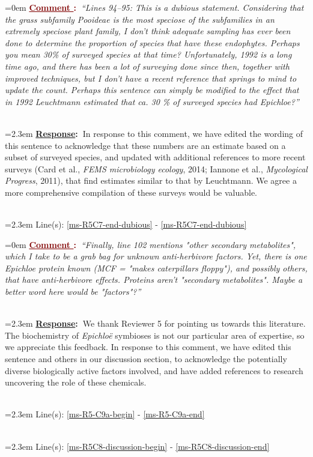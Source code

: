 \documentclass[12pt]{article}
\newcounter{cN}
\newcommand{\comment}[1]{
	\vspace{2em}
	\refstepcounter{cN} %
	\noindent \hangindent=0em \textbf{\textcolor{Maroon}{\uline{Comment \thecN}:~}}\emph{``#1''}
	}
\newcommand{\response}[1]{
	\\[0.25em]
	\hangindent=2.3em \textbf{\textcolor{NavyBlue}{\uline{Response}:~}}#1
	}
\newcommand{\linesref}[2]{
		\\[0.25em]
	\hangindent=2.3em {\color{Mahogany} Line(s): \ref{#1} - \ref{#2}}
}
\begin{document}
\comment{Lines 94–95: This is a dubious statement. Considering that the grass subfamily Pooideae is the most speciose of the subfamilies in an extremely speciose plant family, I don't think adequate sampling has ever been done to determine the proportion of species that have these endophytes. Perhaps you mean 30\% of surveyed species at that time? Unfortunately, 1992 is a long time ago, and there has been a lot of surveying done since then, together with improved techniques, but I don't have a recent reference that springs to mind to update the count. Perhaps this sentence can simply be modified to the effect that in 1992 Leuchtmann estimated that ca. 30 \% of surveyed species had Epichloe?}
\response{In response to this comment, we have edited the wording of this sentence to acknowledge that these numbers are an estimate based on a subset of surveyed species, and updated with additional references to more recent surveys (Card et al., \emph{FEMS microbiology ecology}, 2014; Iannone et al., \emph{Mycological Progress}, 2011), that find estimates similar to that by Leuchtmann. We agree a more comprehensive compilation of these surveys would be valuable.}
\linesref{ms-R5C7-end-dubious}{ms-R5C7-end-dubious}

\comment{Finally, line 102 mentions "other secondary metabolites", which I take to be a grab bag for unknown anti-herbivore factors. Yet, there is one Epichloe protein known (MCF = "makes caterpillars floppy"), and possibly others, that have anti-herbivore effects. Proteins aren't "secondary metabolites". Maybe a better word here would be "factors"?}
\response{We thank Reviewer 5 for pointing us towards this literature. The biochemistry of \emph{Epichloë} symbioses is not our particular area of expertise, so we appreciate this feedback. In response to this comment, we have edited this sentence and others in our discussion section, to acknowledge the potentially diverse biologically active factors involved, and have added references to research uncovering the role of these chemicals.}
\linesref{ms-R5-C9a-begin}{ms-R5-C9a-end}
\linesref{ms-R5C8-discussion-begin}{ms-R5C8-discussion-end}











\end{document}
